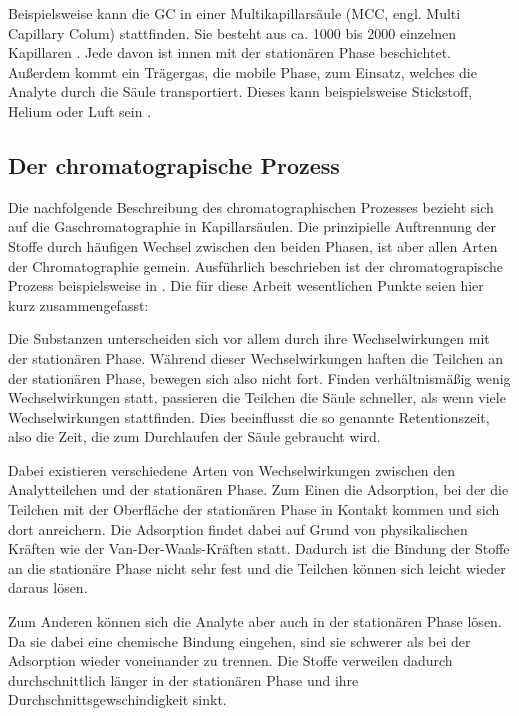 Beispielsweise kann die GC in einer Multikapillarsäule (MCC, engl. Multi Capillary Colum) stattfinden. Sie besteht aus ca. 1000 bis 2000 einzelnen Kapillaren \cite{obinski1999, Baumbach2009}. Jede davon ist innen mit der stationären Phase beschichtet. Außerdem kommt ein Trägergas, die mobile Phase, zum Einsatz, welches die Analyte durch die Säule transportiert. Dieses kann beispielsweise Stickstoff, Helium \cite{obinski1999} oder Luft sein \cite{Baumbach2009}.

\subsection{Der chromatograpische Prozess}
Die nachfolgende Beschreibung des chromatographischen Prozesses bezieht sich auf die Gaschromatographie in Kapillarsäulen. Die prinzipielle Auftrennung der Stoffe durch häufigen Wechsel zwischen den beiden Phasen, ist aber allen Arten der Chromatographie gemein.
Ausführlich beschrieben ist der chromatograpische Prozess beispielsweise in \cite{kolb2003}.
Die für diese Arbeit wesentlichen Punkte seien hier kurz zusammengefasst:

Die Substanzen unterscheiden sich vor allem durch ihre Wechselwirkungen mit der stationären Phase. Während dieser Wechselwirkungen haften die Teilchen an der stationären Phase, bewegen sich also nicht fort. Finden verhältnismäßig wenig Wechselwirkungen statt, passieren die Teilchen die Säule schneller, als wenn viele Wechselwirkungen stattfinden. Dies beeinflusst die so genannte Retentionszeit, also die Zeit, die zum Durchlaufen der Säule gebraucht wird.

Dabei existieren verschiedene Arten von Wechselwirkungen zwischen den Analytteilchen und der stationären Phase. Zum Einen die Adsorption, bei der die Teilchen mit der Oberfläche der stationären Phase in Kontakt kommen und sich dort anreichern. Die Adsorption findet dabei auf Grund von physikalischen Kräften wie der Van-Der-Waals-Kräften statt. Dadurch ist die Bindung der Stoffe an die stationäre Phase nicht sehr fest und die Teilchen können sich leicht wieder daraus lösen.

Zum Anderen können sich die Analyte aber auch in der stationären Phase lösen. Da sie dabei eine chemische Bindung eingehen, sind sie schwerer als bei der Adsorption wieder voneinander zu trennen. Die Stoffe verweilen dadurch durchschnittlich länger in der stationären Phase und ihre Durchschnittsgewschindigkeit sinkt.

